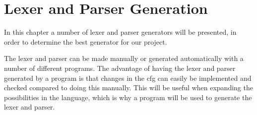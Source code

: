 \chapter{Lexer and Parser Generation}
In this chapter a number of lexer and parser generators will be presented, in order to determine the best generator for our project.

The lexer and parser can be made manually or generated automatically with a number of different programs. The advantage of having the lexer and parser generated by a program is that changes in the cfg can easily be implemented and checked compared to doing this manually. This will be useful when expanding the possibilities in the language, which is why a program will be used to generate the lexer and parser.


